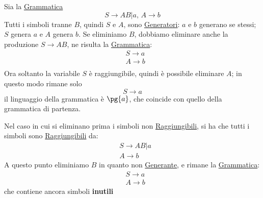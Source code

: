 \begin{example}{}{}
    Sia la \hyperref[def:cfg]{Grammatica}
    \[
        S\to AB|a,\,A\to b
    \]
    Tutti i simboli tranne $B$, quindi $S$ e $A$, sono \hyperref[def:simb-generante]{Generatori}: $a$ e $b$ generano se stessi; $S$ genera $a$ e $A$ genera $b$.
    \emptyln{}
    Se eliminiamo $B$, dobbiamo eliminare anche la produzione $S\to AB$, ne risulta la \hyperref[def:cfg]{Grammatica}:
    \[
        \begin{aligned}
            &S\to a \\
            &A\to b \\
        \end{aligned}
    \]
    Ora soltanto la variabile $S$ è raggiungibile, quindi è possibile eliminare $A$; in questo modo rimane solo
    \[
        S\to a
    \]
    il linguaggio della grammatica è $\pg{a}$, che coincide con quello della grammatica di partenza.
    \begin{note}
        Nel caso in cui si eliminano prima i simboli non \hyperref[def:simb-raggiungibile]{Raggiungibili}, si ha che tutti i simboli sono \hyperref[def:simb-raggiungibile]{Raggiungibili} da:
        \[
            \begin{aligned}
                &S\to AB|a \\
                &A \to b                
            \end{aligned}
        \]
        A questo punto eliminiamo $B$ in quanto non \hyperref[def:simb-generante]{Generante}, e rimane la \hyperref[def:cfg]{Grammatica}:
        \[
            \begin{aligned}
                &S\to a \\
                &A\to b
            \end{aligned}
        \]
        che contiene ancora simboli \textbf{inutili}
    \end{note}
\end{example}
%
